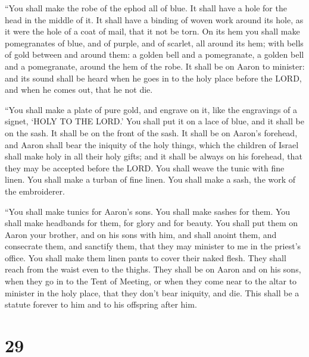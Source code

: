  ``You shall make the robe of the ephod all of blue.
 It shall have a hole for the head in the middle of it.
It shall have a binding of woven work around its hole, as it were the
hole of a coat of mail, that it not be torn.  On its hem
you shall make pomegranates of blue, and of purple, and of scarlet, all
around its hem; with bells of gold between and around them:
 a golden bell and a pomegranate, a golden bell and a
pomegranate, around the hem of the robe.  It shall be on
Aaron to minister: and its sound shall be heard when he goes in to the
holy place before the LORD, and when he comes out, that he not die.

 ``You shall make a plate of pure gold, and engrave on
it, like the engravings of a signet, `HOLY TO THE LORD.' 
You shall put it on a lace of blue, and it shall be on the sash. It
shall be on the front of the sash.  It shall be on
Aaron's forehead, and Aaron shall bear the iniquity of the holy things,
which the children of Israel shall make holy in all their holy gifts;
and it shall be always on his forehead, that they may be accepted before
the LORD.  You shall weave the tunic with fine linen. You
shall make a turban of fine linen. You shall make a sash, the work of
the embroiderer.

 ``You shall make tunics for Aaron's sons. You shall make
sashes for them. You shall make headbands for them, for glory and for
beauty.  You shall put them on Aaron your brother, and on
his sons with him, and shall anoint them, and consecrate them, and
sanctify them, that they may minister to me in the priest's office.
 You shall make them linen pants to cover their naked
flesh. They shall reach from the waist even to the thighs.
 They shall be on Aaron and on his sons, when they go in
to the Tent of Meeting, or when they come near to the altar to minister
in the holy place, that they don't bear iniquity, and die. This shall be
a statute forever to him and to his offspring after him.

\hypertarget{section-28}{%
\section{29}\label{section-28}}


